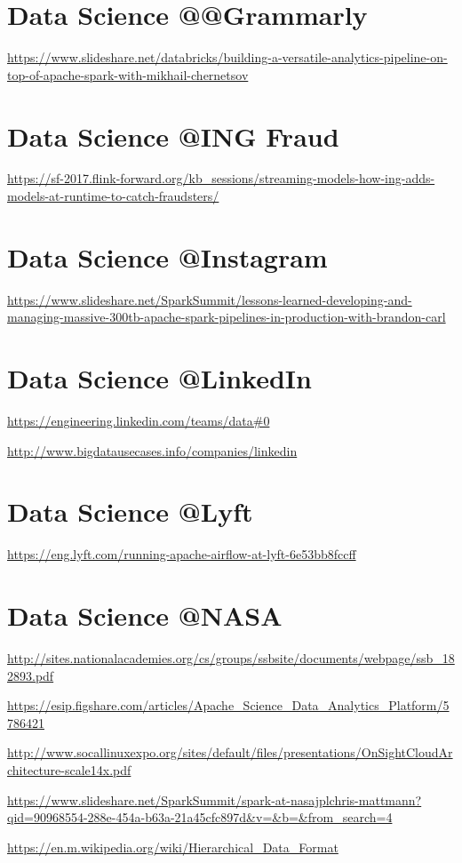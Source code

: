 \documentclass[12pt, numbers=noenddot]{scrreprt} %
\begin{document}
\section{Data Science @@Grammarly}
\url{https://www.slideshare.net/databricks/building-a-versatile-analytics-pipeline-on-top-of-apache-spark-with-mikhail-chernetsov}

\section{Data Science @ING Fraud}
\url{https://sf-2017.flink-forward.org/kb_sessions/streaming-models-how-ing-adds-models-at-runtime-to-catch-fraudsters/}

\section{Data Science @Instagram}
\url{https://www.slideshare.net/SparkSummit/lessons-learned-developing-and-managing-massive-300tb-apache-spark-pipelines-in-production-with-brandon-carl}

\section{Data Science @LinkedIn}
\url{https://engineering.linkedin.com/teams/data#0}

\url{http://www.bigdatausecases.info/companies/linkedin}

\section{Data Science @Lyft}
\url{https://eng.lyft.com/running-apache-airflow-at-lyft-6e53bb8fccff}

\section{Data Science @NASA}
\url{http://sites.nationalacademies.org/cs/groups/ssbsite/documents/webpage/ssb_182893.pdf}

\url{https://esip.figshare.com/articles/Apache_Science_Data_Analytics_Platform/5786421}

\url{http://www.socallinuxexpo.org/sites/default/files/presentations/OnSightCloudArchitecture-scale14x.pdf}

\url{https://www.slideshare.net/SparkSummit/spark-at-nasajplchris-mattmann?qid=90968554-288e-454a-b63a-21a45cfc897d&v=&b=&from_search=4}

\url{https://en.m.wikipedia.org/wiki/Hierarchical_Data_Format}
\end{document}
